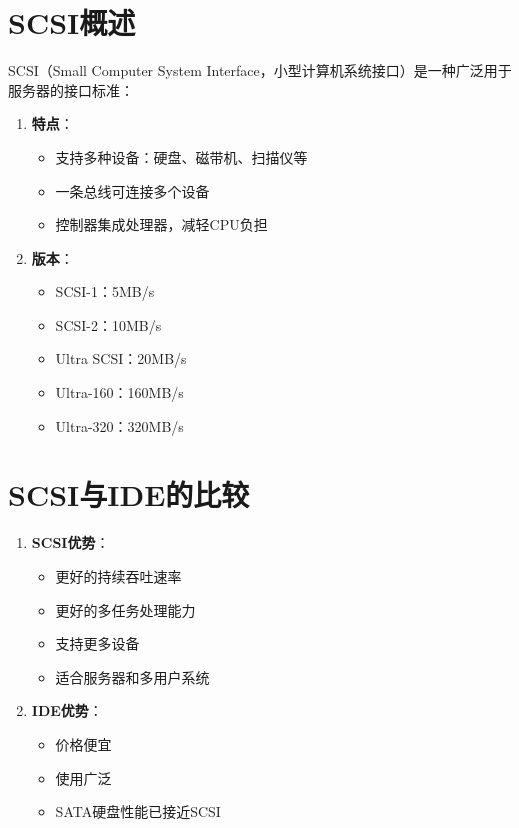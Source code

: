 \documentclass[12pt,UTF8]{ctexbook}
\begin{document}
\section{SCSI概述}

SCSI（Small Computer System Interface，小型计算机系统接口）是一种广泛用于服务器的接口标准：

\begin{enumerate}
    \item \textbf{特点}：
    \begin{itemize}[leftmargin=2em]
        \item 支持多种设备：硬盘、磁带机、扫描仪等
        \item 一条总线可连接多个设备
        \item 控制器集成处理器，减轻CPU负担
    \end{itemize}
    
    \item \textbf{版本}：
    \begin{itemize}[leftmargin=2em]
        \item SCSI-1：5MB/s
        \item SCSI-2：10MB/s
        \item Ultra SCSI：20MB/s
        \item Ultra-160：160MB/s
        \item Ultra-320：320MB/s
    \end{itemize}
\end{enumerate}

\section{SCSI与IDE的比较}

\begin{enumerate}
    \item \textbf{SCSI优势}：
    \begin{itemize}[leftmargin=2em]
        \item 更好的持续吞吐速率
        \item 更好的多任务处理能力
        \item 支持更多设备
        \item 适合服务器和多用户系统
    \end{itemize}
    
    \item \textbf{IDE优势}：
    \begin{itemize}[leftmargin=2em]
        \item 价格便宜
        \item 使用广泛
        \item SATA硬盘性能已接近SCSI
    \end{itemize}
\end{enumerate}
\end{document}
